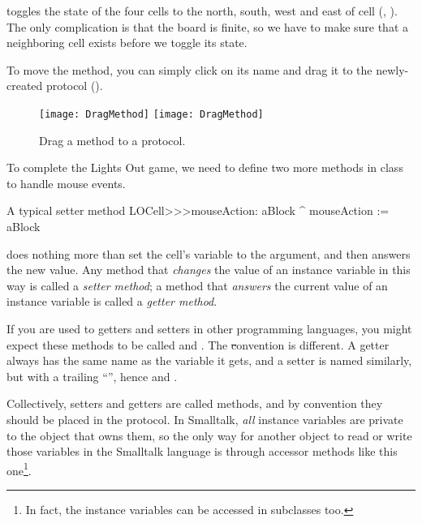 \documentclass[a4paper,10pt,twoside]{book}
\begin{document}
{ toggles the state of the four cells to the north, south, west and east of cell (, ).  The only complication is that the board is finite, so we have to make sure that a neighboring cell exists before we toggle its state.

To move the method, you can simply click on its name and drag it to the newly-created protocol ().

\begin{figure}[htbp]
   \centering
   \ifluluelse
		{\texttt{[image: DragMethod]} }
		{\texttt{[image: DragMethod]} }
   \caption{Drag a method to a protocol.}
\end{figure}

To complete the Lights Out game, we need to define two more methods in class  to handle mouse events.
\begin{method}[mouseAction:]{A typical setter method}
LOCell>>>mouseAction: aBlock
   ^ mouseAction := aBlock
\end{method}

 does nothing more than set the cell's  variable to the argument, and then answers the new value.
Any method that \emph{changes} the value of an instance variable in this way is called a \emph{setter method}; a method that \emph{answers} the current value of an instance variable is called a \emph{getter method}.

If you are used to getters and setters in other programming languages, you might expect these methods to be called  and .
The \st convention is different.
A getter always has the same name as the variable it gets, and a setter is named similarly, but with a trailing ``\ct{:}'', hence  and .

Collectively, setters and getters are called   methods, and by convention they should be placed in the  protocol.
In Smalltalk, \emph{all} instance variables are private to the object that owns them, so the only way for another object to read or write those variables in the Smalltalk language is through accessor methods like this one\footnote{In fact, the instance variables can be accessed in subclasses too.}.

}
\end{document}
